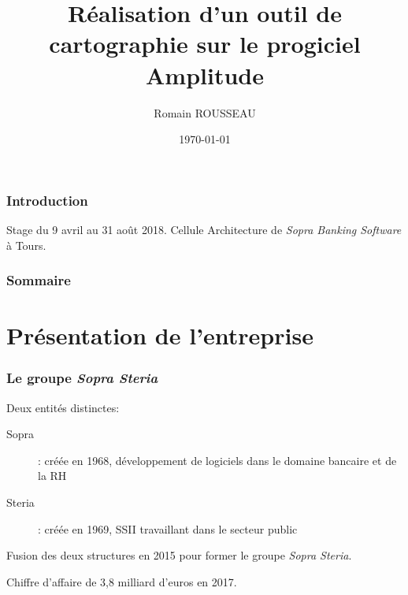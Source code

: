 \documentclass{beamer}
\title{Réalisation d'un outil de cartographie sur le progiciel Amplitude}
\author{Romain ROUSSEAU}
\institute{Sopra Banking Software}
\date{\today}
\begin{document}
	
	
\begin{frame}[plain]
	\titlepage
\end{frame}




\begin{frame}[plain]
\frametitle{Introduction}

Stage du 9 avril au 31 août 2018.
\bigbreak
Cellule Architecture de \textit{Sopra Banking Software} à Tours.

\end{frame}


\begin{frame}

\frametitle{Sommaire}

\tableofcontents

\end{frame}

\section{Présentation de l'entreprise}

\begin{frame}
\frametitle{Le groupe \textit{Sopra Steria}}

\begin{block}{Deux entités distinctes:}
	\begin{description}
		\item[Sopra] : créée en 1968, développement de logiciels dans le domaine bancaire et de la RH
		\item[Steria] : créée en 1969, SSII travaillant dans le secteur public
	\end{description}
\end{block}

\bigbreak 

Fusion des deux structures en 2015 pour former le groupe \textit{Sopra Steria}.

\bigbreak

Chiffre d'affaire de 3,8 milliard d'euros en 2017.

\end{frame}
\end{document}
